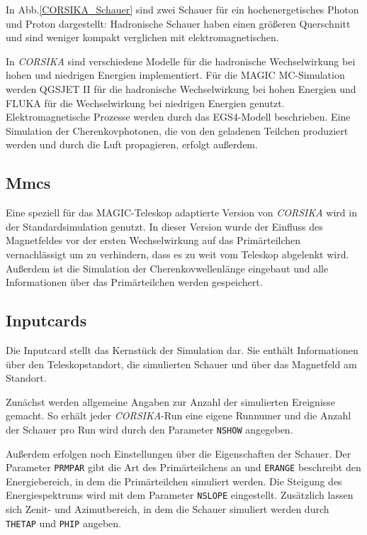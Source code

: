 In Abb.\ref{CORSIKA_Schauer} sind zwei Schauer für ein hochenergetisches Photon und Proton dargestellt: Hadronische Schauer haben einen größeren Querschnitt und sind weniger kompakt verglichen mit elektromagnetischen.

In \textit{CORSIKA} sind verschiedene Modelle für die hadronische Wechselwirkung bei hohen und niedrigen Energien implementiert.
Für die MAGIC MC-Simulation werden QGSJET II für die hadronische Wechselwirkung bei hohen Energien und FLUKA für die Wechselwirkung bei niedrigen Energien genutzt.
Elektromagnetische Prozesse werden durch das EGS4-Modell beschrieben.
Eine Simulation der Cherenkovphotonen, die von den geladenen Teilchen produziert werden und durch die Luft propagieren, erfolgt außerdem.

\subsection{Mmcs}
Eine speziell für das MAGIC-Teleskop adaptierte Version von \textit{CORSIKA} wird in der Standardsimulation genutzt.
In dieser Version wurde der Einfluss des Magnetfeldes vor der ersten Wechselwirkung auf das Primärteilchen vernachlässigt um zu verhindern, dass es zu weit vom Teleskop abgelenkt wird.
Außerdem ist die Simulation der Cherenkovwellenlänge eingebaut und alle Informationen über das Primärteilchen werden gespeichert.

\subsection{Inputcards}
Die Inputcard stellt das Kernstück der Simulation dar.
Sie enthält Informationen über den Teleskopstandort, die simulierten Schauer und über das Magnetfeld am Standort.

Zunächst werden allgemeine Angaben zur Anzahl der simulierten Ereignisse gemacht. 
So erhält jeder \textit{CORSIKA}-Run eine eigene Runnumer und die Anzahl der Schauer pro Run wird durch den Parameter \texttt{NSHOW} angegeben.

Außerdem erfolgen noch Einstellungen über die Eigenschaften der Schauer.
Der Parameter \texttt{PRMPAR} gibt die Art des Primärteilchens an und \texttt{ERANGE} beschreibt den Energiebereich, in dem die Primärteilchen simuliert werden.
Die Steigung des Energiespektrums wird mit dem Parameter \texttt{NSLOPE} eingestellt.
Zusätzlich lassen sich Zenit- und Azimutbereich, in dem die Schauer simuliert werden durch \texttt{THETAP} und \texttt{PHIP} angeben.

